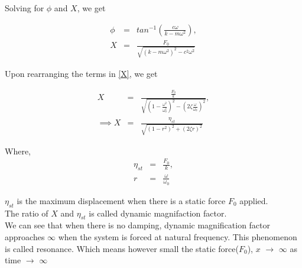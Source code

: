 \documentclass[10pt]{beamer}
\begin{document}
\begin{frame}
Solving for $\phi$ and $X$, we get

\begin{eqnarray}
\phi &=& tan^{-1} \left( \frac{c\omega}{k - m\omega^2} \right), \\
\label{X}
X &=& \frac{F_0}{\sqrt{\left( k - m\omega^2\right)^2 - c^2\omega^2}}
\end{eqnarray}

Upon rearranging the terms in \ref{X}, we get 

\begin{eqnarray}
X &=& \frac{ \frac{F_0}{k} }{ \sqrt{ \left( 1 - \frac{\omega^2}{\omega_0^2} \right)^2 - \left( 2\zeta \frac{\omega}{\omega_0} \right)^2 } }, \\
\implies X &=& \frac{ \eta_{st} }{ \sqrt{ \left( 1 - r^2 \right)^2 + \left( 2\zeta r \right)^2 } } 
\end{eqnarray}

\end{frame}

\begin{frame}
Where,
\begin{eqnarray}
\eta_{st} &=& \frac{F_0}{k}, \\
r &=& \frac{\omega}{\omega_0}
\end{eqnarray}

$\eta_{st}$ is the maximum displacement when there is a static force $F_0$ applied. \\
The ratio  of $X$ and $\eta_{st}$ is called dynamic magnifaction factor. \\
We can see that when there is no damping, dynamic magnification factor approaches $\infty$ 
when the system is forced at natural frequency. This phenomenon is called resonance. Which means 
however small the static force($F_0$), $x$ $\rightarrow$ $\infty$ as time $\rightarrow$ $\infty$

\end{frame}

 
\end{document}

